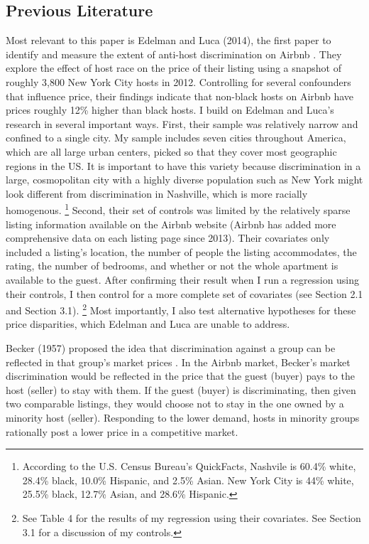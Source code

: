 \subsection{Previous Literature} 
Most relevant to this paper is Edelman and Luca (2014), the first paper to identify and measure the extent of anti-host discrimination on Airbnb \citep{edelman}. They explore the effect of host race on the price of their listing using a snapshot of roughly 3,800 New York City hosts in 2012. Controlling for several confounders that influence price, their findings indicate that non-black hosts on Airbnb have prices roughly 12\% higher than black hosts. I build on Edelman and Luca's research in several important ways. First, their sample was relatively narrow and confined to a single city. My sample includes seven cities throughout America, which are all large urban centers, picked so that they cover most geographic regions in the US. It is important to have this variety because discrimination in a large, cosmopolitan city with a highly diverse population such as New York might look different from discrimination in Nashville, which is more racially homogenous.%
	\footnote{According to the U.S. Census Bureau's QuickFacts, Nashvile is 60.4\% white, 28.4\% black, 10.0\% Hispanic, and 2.5\% Asian. New York City is 44\% white, 25.5\% black, 12.7\% Asian, and 28.6\% Hispanic.} 
Second, their set of controls was limited by the relatively sparse listing information available on the Airbnb website (Airbnb has added more comprehensive data on each listing page since 2013). Their covariates only included a listing's location, the number of people the listing accommodates, the rating, the number of bedrooms, and whether or not the whole apartment is available to the guest. After confirming their result when I run a regression using their controls, I then control for a more complete set of covariates (see Section 2.1 and Section 3.1).%
	\footnote{See Table 4 for the results of my regression using their covariates. See Section 3.1 for a discussion of my controls.} 
Most importantly, I also test alternative hypotheses for these price disparities, which Edelman and Luca are unable to address. 

Becker (1957) proposed the idea that discrimination against a group can be reflected in that group's market prices \citep{becker}. In the Airbnb market, Becker's market discrimination would be reflected in the price that the guest (buyer) pays to the host (seller) to stay with them. If the guest (buyer) is discriminating, then given two comparable listings, they would choose not to stay in the one owned by a minority host (seller). Responding to the lower demand, hosts in minority groups rationally post a lower price in a competitive market. 

